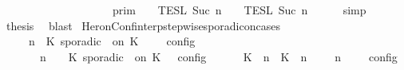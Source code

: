 \begin{isabellebody}
\ \ \ \ \ \ \ \ \ \ \ \ \ \ \ \ \ {\isacharequal}\ {\isasymlbrakk}{\isasymlbrakk}\ {\isasymGamma}\ {\isasymrbrakk}{\isasymrbrakk}\isactrlsub p\isactrlsub r\isactrlsub i\isactrlsub m\ {\isasyminter}\ {\isasymlbrakk}{\isasymlbrakk}\ {\isasymPhi}\ {\isasymrbrakk}{\isasymrbrakk}\isactrlsub T\isactrlsub E\isactrlsub S\isactrlsub L\isactrlbsup {\isasymge}\ Suc\ n\isactrlesup \ {\isasyminter}\ {\isasymlbrakk}{\isasymlbrakk}\ {\isacharbrackleft}{\isacharbrackright}\ {\isasymrbrakk}{\isasymrbrakk}\isactrlsub T\isactrlsub E\isactrlsub S\isactrlsub L\isactrlbsup {\isasymge}\ Suc\ n\isactrlesup {\isacartoucheclose}\isanewline
\ \ \ \ \isamarkupfalse%
\ simp\isanewline
\ \ \isamarkupfalse%
\ \isamarkupfalse%
\ {\isacharquery}thesis\ \isamarkupfalse%
\ blast\isanewline
{}\isamarkupfalse%
%
\endisatagproof
{\isafoldproof}%
%
\isadelimproof
\isanewline
%
\endisadelimproof
\isanewline
{}\isamarkupfalse%
\ HeronConf{\isacharunderscore}interp{\isacharunderscore}stepwise{\isacharunderscore}sporadicon{\isacharunderscore}cases{\isacharcolon}\isanewline
\ \ \ {\isacartoucheopen}{\isasymlbrakk}\ {\isasymGamma}{\isacharcomma}\ n\ {\isasymturnstile}\ {\isacharparenleft}{\isacharparenleft}K\ sporadic\ {\isasymtau}\ on\ K\ {\isacharhash}\ {\isasymPsi}{\isacharparenright}\ {\isasymtriangleright}\ {\isasymPhi}\ {\isasymrbrakk}\isactrlsub c\isactrlsub o\isactrlsub n\isactrlsub f\isactrlsub i\isactrlsub g\isanewline
\ \ \ \ {\isacharequal}\ {\isasymlbrakk}\ {\isasymGamma}{\isacharcomma}\ n\ {\isasymturnstile}\ {\isasymPsi}\ {\isasymtriangleright}\ {\isacharparenleft}{\isacharparenleft}K\ sporadic\ {\isasymtau}\ on\ K\ {\isacharhash}\ {\isasymPhi}{\isacharparenright}\ {\isasymrbrakk}\isactrlsub c\isactrlsub o\isactrlsub n\isactrlsub f\isactrlsub i\isactrlsub g\isanewline
\ \ \ \ {\isasymunion}\ {\isasymlbrakk}\ {\isacharparenleft}{\isacharparenleft}K\ {\isasymUp}\ n{\isacharparenright}\ {\isacharhash}\ {\isacharparenleft}K\ {\isasymDown}\ n\ {\isacharat}\ {\isasymtau}{\isacharparenright}\ {\isacharhash}\ {\isasymGamma}{\isacharparenright}{\isacharcomma}\ n\ {\isasymturnstile}\ {\isasymPsi}\ {\isasymtriangleright}\ {\isasymPhi}\ {\isasymrbrakk}\isactrlsub c\isactrlsub o\isactrlsub n\isactrlsub f\isactrlsub i\isactrlsub g{\isacartoucheclose}\isanewline
%
\isadelimproof
%
\endisadelimproof
%
\isatagproof

\end{isabellebody}

